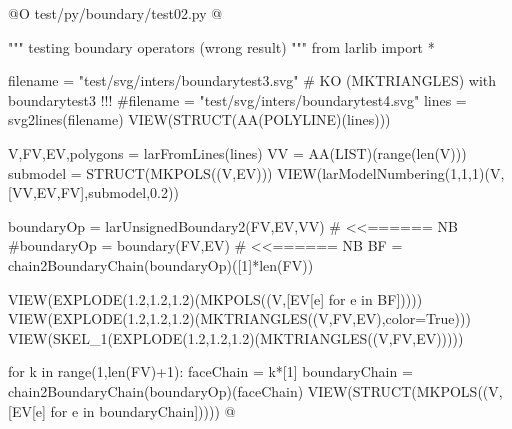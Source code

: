 \documentclass[11pt,oneside]{article}	%
\begin{document}
@O test/py/boundary/test02.py
@{""" testing boundary operators (wrong result) """
from larlib import *

filename = "test/svg/inters/boundarytest3.svg" # KO (MKTRIANGLES) with boundarytest3 !!!
#filename = "test/svg/inters/boundarytest4.svg"
lines = svg2lines(filename)
VIEW(STRUCT(AA(POLYLINE)(lines)))
    
V,FV,EV,polygons = larFromLines(lines)
VV = AA(LIST)(range(len(V)))
submodel = STRUCT(MKPOLS((V,EV)))
VIEW(larModelNumbering(1,1,1)(V,[VV,EV,FV],submodel,0.2))

boundaryOp = larUnsignedBoundary2(FV,EV,VV)  # <<======  NB
#boundaryOp = boundary(FV,EV)  # <<======  NB
BF = chain2BoundaryChain(boundaryOp)([1]*len(FV))

VIEW(EXPLODE(1.2,1.2,1.2)(MKPOLS((V,[EV[e] for e in BF])))) 
VIEW(EXPLODE(1.2,1.2,1.2)(MKTRIANGLES((V,FV,EV),color=True))) 
VIEW(SKEL_1(EXPLODE(1.2,1.2,1.2)(MKTRIANGLES((V,FV,EV))))) 

for k in range(1,len(FV)+1):
    faceChain = k*[1]
    boundaryChain = chain2BoundaryChain(boundaryOp)(faceChain)
    VIEW(STRUCT(MKPOLS((V,[EV[e] for e in boundaryChain]))))
@}
\end{document}
